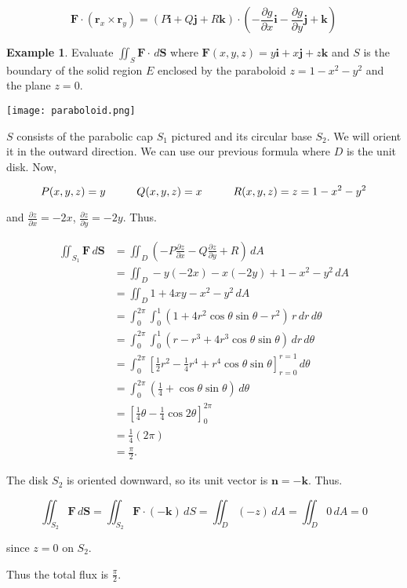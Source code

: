 \documentclass[11pt,oneside,english]{amsart}
\theoremstyle{definition}
\newtheorem*{example}{Example}
\newcommand{\pspace}{\hspace{10mm}}
\newcommand{\pp}[2]{\frac{\partial{#1}}{\partial{#2}}}
\begin{document}
\[
\mathbf{F}\cdot(\mathbf{r}_x\times\mathbf{r}_y)=(P\mathbf{i}+Q\mathbf{j}+R\mathbf{k})\cdot\left(-\pp{g}{x}\mathbf{i}-\pp{g}{y}\mathbf{j}+\mathbf{k}\right)
\]

\vspace{7mm}
\begin{example}
Evaluate $\iint_S\mathbf{F}\cdot\,d\mathbf{S}$ where $\mathbf{F}(x,y,z)=y\mathbf{i}+x\mathbf{j}+z\mathbf{k}$ and $S$ is the boundary of the solid region $E$ enclosed by the paraboloid $z=1-x^2-y^2$ and the plane $z=0$.


\begin{center}
\texttt{[image: paraboloid.png]}
\end{center}

$S$ consists of the parabolic cap $S_1$ pictured and its circular base $S_2$. We will orient it in the outward direction. We can use our previous formula where $D$ is the unit disk. Now,

\[
P(x,y,z)=y\pspace Q(x,y,z)=x\pspace R(x,y,z)=z=1-x^2-y^2
\]

and $\pp{z}{x}=-2x$, $\pp{z}{y}=-2y$. Thus.

\begin{align*}
\iint_{S_1}\mathbf{F}\,d\mathbf{S}&=\iint_D\left(-P\pp{z}{x}-Q\pp{z}{y}+R\right)\,dA\\[2mm]
&=\iint_D-y(-2x)-x(-2y)+1-x^2-y^2\,dA\\[2mm]
&=\iint_D1+4xy-x^2-y^2\,dA\\[2mm]
&=\int_0^{2\pi}\int_0^1(1+4r^2\cos\theta\sin\theta-r^2)\,r\,dr\,d\theta\\[2mm]
&=\int_0^{2\pi}\int_0^1(r-r^3+4r^3\cos\theta\sin\theta)\,dr\,d\theta\\[2mm]
&=\int_0^{2\pi}\left[\frac{1}{2}r^2-\frac{1}{4}r^4+r^4\cos\theta\sin\theta\right]_{r=0}^{r=1}\,d\theta\\[2mm]
&=\int_0^{2\pi}\left(\frac{1}{4}+\cos\theta\sin\theta\right)\,d\theta\\[2mm]
&=\left[\frac{1}{4}\theta-\frac{1}{4}\cos2\theta\right]_0^{2\pi}\\[2mm]
&=\frac{1}{4}(2\pi)\\[2mm]
&=\frac{\pi}{2}.
\end{align*}

The disk $S_2$ is oriented downward, so its unit vector is $\mathbf{n}=-\mathbf{k}$. Thus.

\[
\iint_{S_2}\mathbf{F}\,d\mathbf{S}=\iint_{S_2}\mathbf{F}\cdot(-\mathbf{k})\,dS=\iint_D(-z)\,dA=\iint_D0\,dA=0
\]

since $z=0$ on $S_2$.

Thus the total flux is $\frac{\pi}{2}$.


\end{example}
\end{document}
